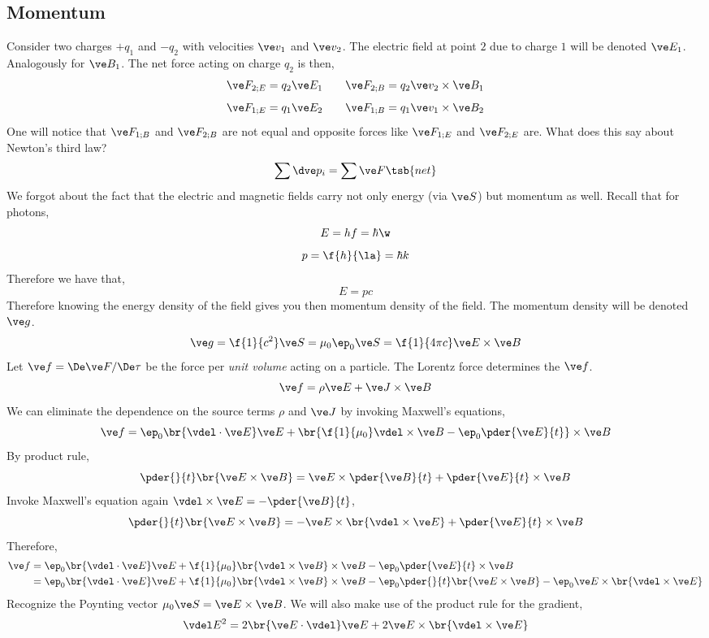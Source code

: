 \documentclass{article}
\begin{document}
\subsection{Momentum}
Consider two charges $+q_1$ and $-q_2$ with velocities $\ve v_1$ and $\ve v_2$. The electric field at point $2$ due to charge $1$ will be denoted $\ve E_1$. Analogously for $\ve B_1$. The net force acting on charge $q_2$ is then,
\[ \ve F_{2;E} = q_2 \ve E_1 \qquad \ve F_{2;B} = q_2 \ve v_2 \times \ve B_1 \]
\[ \ve F_{1;E} = q_1 \ve E_2 \qquad \ve F_{1;B} = q_1 \ve v_1 \times \ve B_2 \]
One will notice that $\ve F_{1;B}$ and $\ve F_{2;B}$ are not equal and opposite forces like $\ve F_{1;E}$ and $\ve F_{2;E}$ are. What does this say about Newton's third law?
\[ \sum \dve p_i = \sum \ve F\tsb{net} \]
We forgot about the fact that the electric and magnetic fields carry not only energy (via $\ve S$) but momentum as well. Recall that for photons,
\[ E = h f = \hbar \w  \]
\[ p = \f{h}{\la} = \hbar k \]
Therefore we have that,
\[ E = pc \]
Therefore knowing the energy density of the field gives you then momentum density of the field. The momentum density will be denoted $\ve g$.
\[ \ve g = \f{1}{c^2} \ve S = \mu_0 \ep_0 \ve S = \f{1}{4 \pi c} \ve E \times \ve B \]
Let $\ve f = \De \ve F / \De \tau$ be the force per \textit{unit volume} acting on a particle. The Lorentz force determines the $\ve f$.
\[ \ve f = \rho \ve E + \ve J \times \ve B\]
We can eliminate the dependence on the source terms $\rho$ and $\ve J$ by invoking Maxwell's equations,
\[ \ve f = \ep_0 \br{\vdel \cdot \ve E} \ve E + \br{\f{1}{\mu_0} \vdel \times \ve B - \ep_0 \pder{\ve E}{t}} \times \ve B \]
By product rule,
\[ \pder{}{t}\br{\ve E \times \ve B} = \ve E \times \pder{\ve B}{t} + \pder{\ve E}{t} \times \ve B \]
Invoke Maxwell's equation again $\vdel \times \ve E = - \pder{\ve B}{t}$,
\[ \pder{}{t}\br{\ve E \times \ve B} = -\ve E \times \br{\vdel \times \ve E} + \pder{\ve E}{t} \times \ve B \]
Therefore,
\begin{align*}
\ve f
&= \ep_0 \br{\vdel \cdot \ve E} \ve E + \f{1}{\mu_0} \br{\vdel \times \ve B} \times \ve B - \ep_0 \pder{\ve E}{t}\times\ve B  \\
&= \ep_0 \br{\vdel \cdot \ve E} \ve E + \f{1}{\mu_0} \br{\vdel \times \ve B} \times \ve B - \ep_0 \pder{}{t}\br{\ve E \times \ve B} - \ep_0\ve E \times \br{\vdel \times \ve E}
\end{align*}
Recognize the Poynting vector $\mu_0 \ve S = \ve E \times \ve B$. We will also make use of the product rule for the gradient,
\[ \vdel E^2 = 2 \br{\ve E \cdot \vdel} \ve E + 2 \ve E \times \br{\vdel \times \ve E} \]
\end{document}
